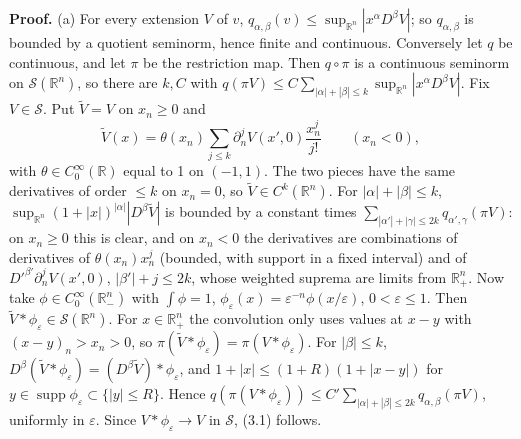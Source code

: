 \documentclass[
  11pt,
]{article}
\begin{document}
\textbf{Proof.} (a) For every extension \(V\) of \(v\),
\(q_{\alpha,\beta}(v)\leq\sup_{\mathbb R^n}|x^\alpha D^\beta V|\); so
\(q_{\alpha,\beta}\) is bounded by a quotient seminorm, hence finite and
continuous. Conversely let \(q\) be continuous, and let \(\pi\) be the
restriction map. Then \(q\circ\pi\) is a continuous seminorm on
\(\mathcal S(\mathbb R^n)\), so there are \(k,C\) with
\(q(\pi V)\leq C\sum_{|\alpha|+|\beta|\leq k}\sup_{\mathbb R^n}|x^\alpha D^\beta V|\).
Fix \(V\in\mathcal S\). Put \(\tilde V=V\) on \(x_n\geq0\) and \[
\tilde V(x)=\theta(x_n)\sum_{j\leq k}\partial_n^jV(x',0)\frac{x_n^j}{j!}\qquad(x_n<0),
\] with \(\theta\in C_0^\infty(\mathbb R)\) equal to 1 on \((-1,1)\).
The two pieces have the same derivatives of order \(\leq k\) on
\(x_n=0\), so \(\tilde V\in C^k(\mathbb R^n)\). For
\(|\alpha|+|\beta|\leq k\),
\(\sup_{\mathbb R^n}(1+|x|)^{|\alpha|}|D^\beta\tilde V|\) is bounded by
a constant times
\(\sum_{|\alpha'|+|\gamma|\leq2k}q_{\alpha',\gamma}(\pi V)\): on
\(x_n\geq0\) this is clear, and on \(x_n<0\) the derivatives are
combinations of derivatives of \(\theta(x_n)x_n^j\) (bounded, with
support in a fixed interval) and of \(D'^{\beta'}\partial_n^jV(x',0)\),
\(|\beta'|+j\leq2k\), whose weighted suprema are limits from
\(\mathbb R^n_+\). Now take \(\phi\in C_0^\infty(\mathbb R^n_-)\) with
\(\int\phi=1\),
\(\phi_\varepsilon(x)=\varepsilon^{-n}\phi(x/\varepsilon)\),
\(0<\varepsilon\leq1\). Then
\(\tilde V*\phi_\varepsilon\in\mathcal S(\mathbb R^n)\). For
\(x\in\mathbb R^n_+\) the convolution only uses values at \(x-y\) with
\((x-y)_n>x_n>0\), so
\(\pi(\tilde V*\phi_\varepsilon)=\pi(V*\phi_\varepsilon)\). For
\(|\beta|\leq k\),
\(D^\beta(\tilde V*\phi_\varepsilon)=(D^\beta\tilde V)*\phi_\varepsilon\),
and \(1+|x|\leq(1+R)(1+|x-y|)\) for
\(y\in\operatorname{supp}\phi_\varepsilon\subset\{|y|\leq R\}\). Hence
\(q(\pi(V*\phi_\varepsilon))\leq C'\sum_{|\alpha|+|\beta|\leq2k}q_{\alpha,\beta}(\pi V)\),
uniformly in \(\varepsilon\). Since \(V*\phi_\varepsilon\to V\) in
\(\mathcal S\), (3.1) follows.
\end{document}
